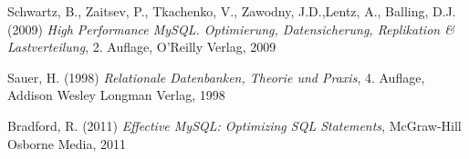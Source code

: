 \newpage
{}
  \begin{thebibliography}{}



     Schwartz, B., Zaitsev, P., Tkachenko, V., Zawodny, J.D.,Lentz, A., Balling, D.J. (2009) 
     {\sl High Performance MySQL. Optimierung, Datensicherung, Replikation \& Lastverteilung}, 2. Auflage,  O'Reilly Verlag, 2009

     Sauer, H. (1998) {\sl Relationale Datenbanken, Theorie und Praxis}, 4. Auflage, Addison Wesley Longman Verlag, 1998

     Bradford, R. (2011) {\sl Effective MySQL: Optimizing SQL Statements}, McGraw-Hill Osborne Media, 2011

  \end{thebibliography}


 